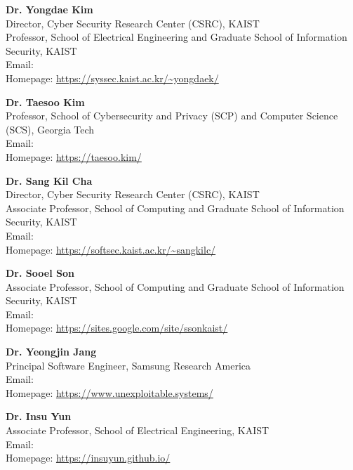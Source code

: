 {}

\begin{timeenumerate}{}{}
    \item \textbf{Dr. Yongdae Kim} \\
    {\small Director, Cyber Security Research Center (CSRC), KAIST \\
    Professor, School of Electrical Engineering and Graduate School of Information Security, KAIST \\
    Email:  \\
    Homepage: \url{https://syssec.kaist.ac.kr/~yongdaek/}}

    \item \textbf{Dr. Taesoo Kim} \\
    {\small Professor, School of Cybersecurity and Privacy (SCP) and Computer Science (SCS), Georgia Tech \\
    Email:  \\
    Homepage: \url{https://taesoo.kim/}}

    \item \textbf{Dr. Sang Kil Cha} \\
    {\small Director, Cyber Security Research Center (CSRC), KAIST \\
    Associate Professor, School of Computing and Graduate School of Information Security, KAIST \\
    Email:  \\
    Homepage: \url{https://softsec.kaist.ac.kr/~sangkilc/}}

    \item \textbf{Dr. Sooel Son} \\
    {\small Associate Professor, School of Computing and Graduate School of Information Security, KAIST \\
    Email:  \\
    Homepage: \url{https://sites.google.com/site/ssonkaist/}}

    \item \textbf{Dr. Yeongjin Jang} \\
    {\small Principal Software Engineer, Samsung Research America \\
    Email:  \\
    Homepage: \url{https://www.unexploitable.systems/}}

    \item \textbf{Dr. Insu Yun} \\
    {\small Associate Professor, School of Electrical Engineering, KAIST \\
    Email:  \\
    Homepage: \url{https://insuyun.github.io/}}
\end{timeenumerate}
